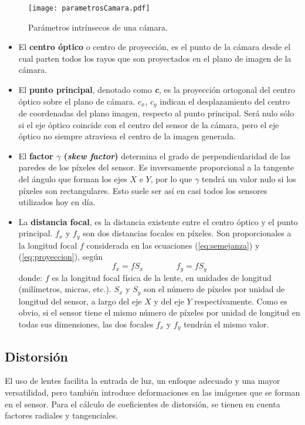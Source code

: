 \begin{figure}[h]
  \centering
  \texttt{[image: parametrosCamara.pdf]}
  \caption{Parámetros intrínsecos de una cámara.}
  \label{fig:FIGparamCam}
\end{figure}

\begin{itemize}
\item El \textbf{centro óptico} o centro de proyección, es el punto de la cámara desde el cual parten todos los rayos que son proyectados en el plano de imagen de la cámara.

\item El \textbf{punto principal}, denotado como \textbf{\textit{c}}, es la proyección ortogonal del centro óptico sobre el plano de cámara.  $c_x$, $c_y$ indican el desplazamiento del centro de coordenadas del plano imagen, respecto al punto principal. Será nulo sólo si el eje óptico coincide con el centro del sensor de la cámara, pero el eje óptico no siempre atraviesa el centro de la imagen generada. 

\item El \textbf{factor $\gamma$ (\textit{skew factor})} determina el grado de perpendicularidad de las paredes de los píxeles del sensor. Es inversamente proporcional a la tangente del ángulo que forman los ejes $X$ e $Y$, por lo que  $\gamma$ tendrá un valor nulo si los píxeles son rectangulares. Esto suele ser así en casi todos los sensores utilizados hoy en día. 

\item La \textbf{distancia focal}, es la distancia existente entre el centro óptico y el punto principal. $f_x$ y $f_y$ son dos distancias focales en píxeles. Son proporcionales a la longitud focal $f$ considerada en las ecuaciones (\ref{eq:semejanza}) y (\ref{eq:proyeccion}), según 
\begin{equation}
f_x = f S_x \quad \quad  \quad \quad f_y = f S_y
\end{equation}
donde: $f$ es la longitud focal física de la lente, en unidades de longitud (milímetros, micras, etc.). $S_x$ y $S_y$ son el número de píxeles por unidad de longitud del sensor, a largo del eje $X$ y del eje $Y$ respectívamente. Como es obvio, si el sensor tiene el mismo número de píxeles por unidad de longitud en todas sus dimensiones, las dos focales $f_x$ y $f_y$ tendrán el mismo valor.
\end{itemize}

\subsection{Distorsión}
El uso de lentes facilita la entrada de luz, un enfoque adecuado y una mayor versatilidad, pero también introduce deformaciones en las imágenes que se forman en el sensor. Para el cálculo de coeficientes de distorsión, se tienen en cuenta factores radiales y tangenciales. 

